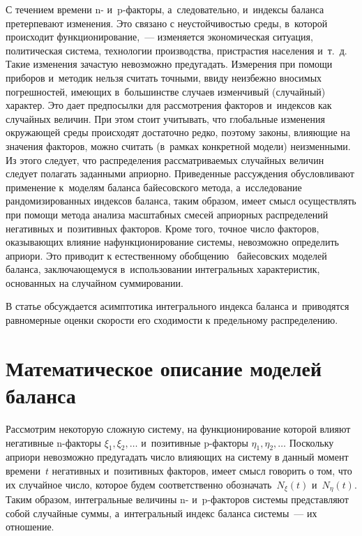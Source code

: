 \begin{multicols}{2}
С течением времени n- и~p-фак\-то\-ры, а~следовательно, и~индексы баланса 
претерпевают изменения. Это связано с неустойчивостью среды, в~которой 
происходит функционирование,~--- изменяется экономическая ситуация, политическая 
сис\-те\-ма, технологии производства, пристрастия населения и~т.~д. Такие изменения 
зачастую невозможно предугадать. Измерения при помощи приборов и~методик нельзя 
считать точными, ввиду неизбежно вносимых погрешностей, име\-ющих в~большинстве 
случаев изменчивый (случайный) характер. Это дает предпосылки для рассмотрения 
факторов и~индексов как случайных величин. При этом стоит учитывать, что 
глобальные изменения окружающей среды происходят достаточно редко, поэтому 
законы, влияющие на значения факторов, можно считать (в~рамках конкретной 
модели) неизменными. Из этого следует, что распределения рассматриваемых 
случайных величин следует полагать заданными априорно.
Приведенные рассуждения обусловливают применение к~моделям баланса байесовского 
метода, а~исследование рандомизированных индексов баланса, таким образом, имеет 
смысл осуществлять при помощи метода анализа масштабных смесей априорных 
распределений негативных и~позитивных факторов.
Кроме того, точное число факторов, оказывающих влияние на\linebreak функционирование 
сис\-те\-мы, невозможно определить ап\-ри\-ори. Это приводит к естественному 
обоб\-ще\-нию~\cite{KuShe2022_1_ru} байесовских моделей баланса, за\-клю\-ча\-юще\-му\-ся 
в~использовании интегральных \mbox{характеристик}, основанных на случайном суммировании.

В статье обсуждается асимптотика интегрального индекса баланса и~приводятся 
равномерные оценки скорости его сходимости к предельному распределению.

\section{Математическое описание моделей баланса}

Рассмотрим некоторую сложную систему, на функционирование которой влияют 
негативные n-фак\-то\-ры $\xi_1,\xi_2,\ldots$ и~позитивные p-фак\-то\-ры 
$\eta_1,\eta_2,\ldots$ Поскольку априори невозможно предугадать чис\-ло влияющих 
на систему в данный момент времени~$t$ негативных и~позитивных факторов, имеет 
смысл говорить о том, что их случайное чис\-ло, которое будем соответственно 
обозначать~$N_\xi(t)$ и~$N_\eta(t)$. Таким образом, интегральные величины n- и~p-фак\-то\-ров сис\-те\-мы 
пред\-став\-ля\-ют собой случайные суммы, а~интегральный индекс 
баланса сис\-те\-мы~--- их отношение.


\end{multicols}
